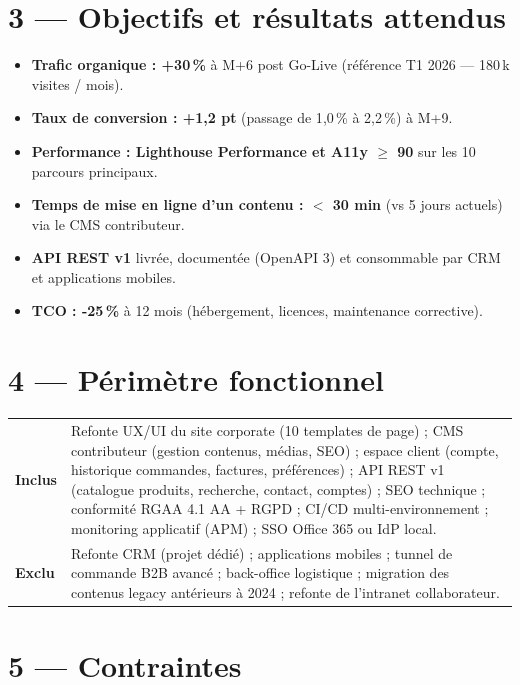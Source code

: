 \documentclass[11pt,a4paper,oneside]{report}
\begin{document}
\section*{3 — Objectifs et résultats attendus}
\begin{itemize}
  \item \textbf{Trafic organique : +30\,\%} à M+6 post Go-Live (référence T1 2026 — 180\,k visites / mois).
  \item \textbf{Taux de conversion : +1{,}2 pt} (passage de 1{,}0\,\% à 2{,}2\,\%) à M+9.
  \item \textbf{Performance : Lighthouse Performance et A11y $\geq$ 90} sur les 10 parcours principaux.
  \item \textbf{Temps de mise en ligne d'un contenu : $<$ 30 min} (vs 5 jours actuels) via le CMS contributeur.
  \item \textbf{API REST v1} livrée, documentée (OpenAPI 3) et consommable par CRM et applications mobiles.
  \item \textbf{TCO : -25\,\%} à 12 mois (hébergement, licences, maintenance corrective).
\end{itemize}

\section*{4 — Périmètre fonctionnel}

\renewcommand{\arraystretch}{1.3}
\begin{tabularx}{\textwidth}{L{1.5cm} Y}
\toprule
{}\th{} & \th{} \\
\midrule
{}\textbf{Inclus} & Refonte UX/UI du site corporate (10 templates de page) ; CMS contributeur (gestion contenus, médias, SEO) ; espace client (compte, historique commandes, factures, préférences) ; API REST v1 (catalogue produits, recherche, contact, comptes) ; SEO technique ; conformité RGAA 4.1 AA + RGPD ; CI/CD multi-environnement ; monitoring applicatif (APM) ; SSO Office 365 ou IdP local. \\
\textbf{Exclu} & Refonte CRM (projet dédié) ; applications mobiles ; tunnel de commande B2B avancé ; back-office logistique ; migration des contenus legacy antérieurs à 2024 ; refonte de l'intranet collaborateur. \\
\bottomrule
\end{tabularx}

\section*{5 — Contraintes}
\end{document}
